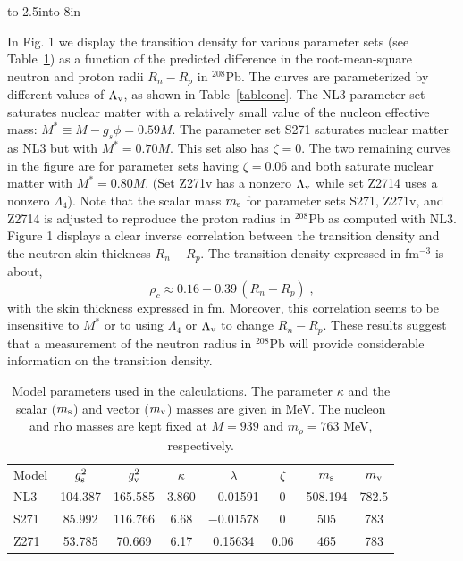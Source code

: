 \vbox to 2.5in{\vss\hbox to 8in{\hss}}
\vskip 8pt

In Fig. 1 we display the transition density for various parameter 
sets (see Table~\ref{tabletwo}) as a function of the predicted 
difference in the root-mean-square neutron and proton radii 
$R_n\!-\!R_p$ in $^{208}$Pb. The curves are parameterized by different 
values of $\Lambda_{\rm v}$, as shown in Table~\ref{tableone}. 
The NL3 parameter set saturates nuclear matter with a relatively 
small value of the nucleon effective mass: 
$M^*\!\equiv\!M\!-\!g_s\phi\!=\!0.59M$. The parameter set S271 
saturates nuclear matter as NL3 but with $M^*\!=\!0.70M$. This set 
also has $\zeta\!=\!0$. The two remaining curves in the figure are 
for parameter sets having $\zeta\!=\!0.06$ and both saturate nuclear 
matter with $M^*\!=\!0.80M$. (Set Z271v has a nonzero 
$\Lambda_{\rm v}$ while set Z2714 uses a nonzero 
$\Lambda_4$). Note that the scalar mass $m_{\rm s}$ for parameter 
sets S271, Z271v, and Z2714 is adjusted to reproduce the proton 
radius in $^{208}$Pb as computed with NL3. Figure 1 displays a clear 
inverse correlation between the transition density and the neutron-skin 
thickness $R_n\!-\!R_p$. The transition density expressed in 
fm$^{-3}$ is about,
\begin{equation}
\rho_{c}\approx 0.16 - 0.39\,(R_n-R_p) \;,
\end{equation}
with the skin thickness expressed in fm. Moreover, this correlation
seems to be insensitive to $M^*$ or to using $\Lambda_4$ or 
$\Lambda_{\rm v}$ to change $R_n\!-\!R_p$. These results suggest 
that a measurement of the neutron radius in $^{208}$Pb will 
provide considerable information on the transition density.

\begin{table}
\caption{Model parameters used in the calculations. The 
parameter $\kappa$ and the scalar ($m_{\rm s}$) and vector 
($m_{\rm v}$) masses are given in MeV. The nucleon and rho 
masses are kept fixed at $M\!=\!939$ and $m_\rho\!=\!763$ MeV, 
respectively.}

\begin{tabular}{lccccccc}
Model & $g_{\rm s}^2$ & $g_{\rm v}^2$ & $\kappa$ & 
        $\lambda$ & $\zeta$ & $m_{\rm s}$ & $m_{\rm v}$ \\ 
NL3  & 104.387 & 165.585 & 3.860 & $-$0.01591 & 0 & 508.194 & 782.5 \\ 
S271 &  85.992 & 116.766 & 6.68  & $-$0.01578 & 0 & 505     & 783   \\ 
Z271 &  53.785 &  70.669 & 6.17  &    0.15634 & 0.06 & 465  & 783   
\label{tabletwo}
\end{tabular}
\end{table}

